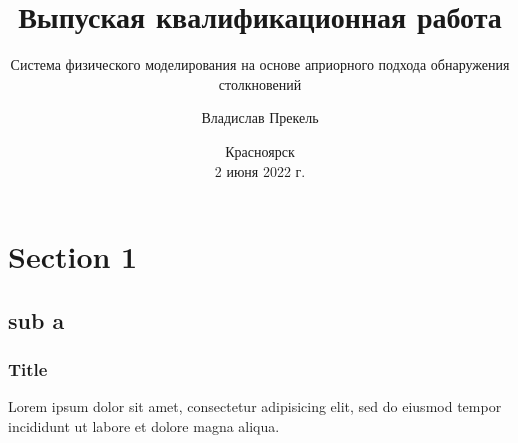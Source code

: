 \documentclass[xetex]{beamer}
\title{Выпуская квалификационная работа}
\subtitle{Система физического моделирования на основе априорного подхода обнаружения столкновений}
\author{Владислав Прекель}
\institute{ИКИТ СФУ\\КИ18-16б}
\date{Красноярск\\2 июня 2022 г.}
\begin{document}
\begin{frame}
    \titlepage
\end{frame}

\section{Section 1}
\subsection{sub a}

\begin{frame}
    \frametitle{Title}
    Lorem ipsum dolor sit amet, consectetur adipisicing elit, sed do eiusmod tempor incididunt ut labore et dolore magna aliqua.
\end{frame}

\begin{frame}
    \titlepage
\end{frame}
\end{document}
